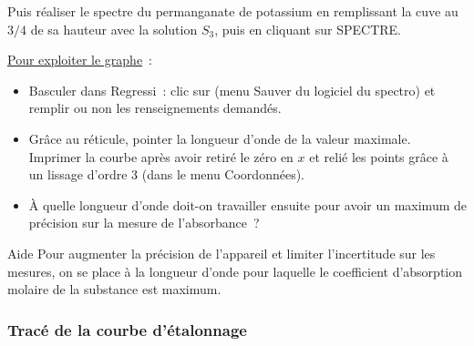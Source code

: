 \documentclass[a4paper, 11pt, final, garamond]{book}
\begin{document}
Puis réaliser le spectre du permanganate de potassium en remplissant la cuve au
$3/4$ de sa hauteur avec la solution $S_3$, puis en cliquant sur SPECTRE.

\medskip

\underline{ Pour exploiter le graphe}~:
\begin{itemize}
    \item Basculer dans Regressi~: clic sur  (menu Sauver du logiciel
        du spectro) et remplir ou non les renseignements demandés.
    \item Grâce au réticule, pointer la longueur d'onde de la valeur maximale.
        Imprimer la courbe après avoir retiré le zéro en $x$ et relié les points
        grâce à un lissage d'ordre 3 (dans le menu Coordonnées).
    \item À quelle longueur d'onde doit-on travailler ensuite pour avoir un
        maximum de précision sur la mesure de l'absorbance~?
\end{itemize}
\begin{instruc}[tikz={rotate=180, transform shape}]{Aide}
    Pour augmenter la précision de l'appareil et limiter l'incertitude sur
    les mesures, on se place à la longueur d'onde pour laquelle le
    coefficient d'absorption molaire de la substance est maximum.
\end{instruc}

\subsubsection{Tracé de la courbe d'étalonnage}
\end{document}

